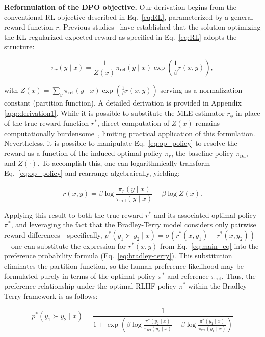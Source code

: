 \textbf{Reformulation of the DPO objective.} Our derivation begins from the conventional RL objective described in Eq.~\ref{eq:RL}, parameterized by a general reward function $r$. Previous studies~\citep{peters2007reinforcement, peng2019advantage, korbak2022reinforcement, go2023aligning} have established that the solution optimizing the KL-regularized expected reward as specified in Eq.~\ref{eq:RL} adopts the structure:

\begin{equation}\label{eq:op_policy}
    \pi_r(y\mid x) = \frac{1}{Z(x)}\pi_\text{ref}(y\mid x)\exp\left(\frac{1}{\beta}r(x, y)\right),
\end{equation}

with $Z(x) =\sum_{y}\pi_\text{ref}(y\mid x)\exp\left(\frac{1}{\beta}r(x, y)\right)$ serving as a normalization constant (partition function). A detailed derivation is provided in Appendix \ref{app:derivation1}. While it is possible to substitute the MLE estimator $r_{\phi}$ in place of the true reward function $r^*$, direct computation of $Z(x)$ remains computationally burdensome~\citep{korbak2022reinforcement, go2023aligning}, limiting practical application of this formulation. Nevertheless, it is possible to manipulate Eq.~\ref{eq:op_policy} to resolve the reward as a function of the induced optimal policy $\pi_r$, the baseline policy $\pi_\text{ref}$, and $Z(\cdot)$. To accomplish this, one can logarithmically transform Eq.~\ref{eq:op_policy} and rearrange algebraically, yielding:

\begin{equation}\label{eq:main_eq}
    r(x,y) =\beta \log \frac{\pi_r(y\mid x)}{\pi_\text{ref}(y\mid x)} + \beta \log Z(x).
\end{equation}

Applying this result to both the true reward $r^*$ and its associated optimal policy $\pi^*$, and leveraging the fact that the Bradley-Terry model considers only pairwise reward differences—specifically, ${p^*(y_1 \succ y_2 \mid x) = \sigma(r^*(x, y_1) - r^*(x, y_2))}$—one can substitute the expression for $r^*(x,y)$ from Eq.~\ref{eq:main_eq} into the preference probability formula (Eq.~\ref{eq:bradley-terry}). This substitution eliminates the partition function, so the human preference likelihood may be formulated purely in terms of the optimal policy $\pi^*$ and reference $\pi_\text{ref}$. Thus, the preference relationship under the optimal RLHF policy $\pi^*$ within the Bradley-Terry framework is as follows:

\begin{equation}\label{eq:objective}
    p^*(y_1\succ y_2 \mid x)=\frac{1}{1 + \exp\left(\beta \log \frac{\pi^*(y_2\mid x)}{\pi_\text{ref}(y_2\mid x)} - \beta \log \frac{\pi^*(y_1\mid x)}{\pi_\text{ref}(y_1\mid x)}\right)}
\end{equation}


